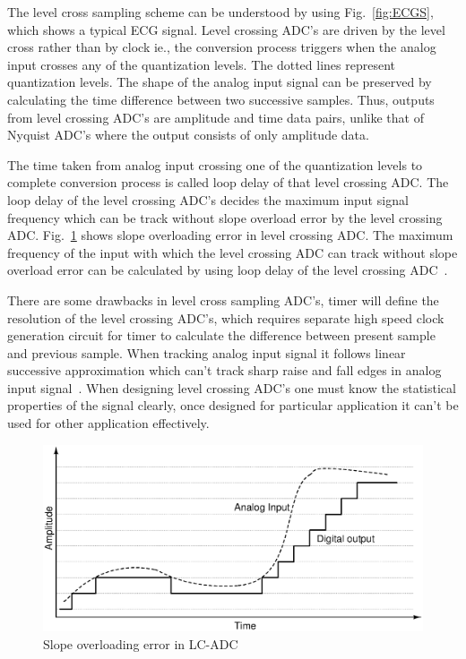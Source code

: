 \par
\hspace{0.6cm} 	The level cross sampling scheme can be understood by using Fig.~\ref{fig:ECGS}, which shows a typical ECG signal. Level crossing \mbox{ADC's} are driven by the level cross rather than by clock ie., the conversion process triggers when the analog input crosses any of the quantization levels. The dotted lines represent quantization levels. The shape of the analog input signal can be preserved by calculating the time difference between two successive samples. Thus, outputs from level crossing \mbox{ADC's} are amplitude and time data pairs, unlike that of Nyquist \mbox{ADC's} where the output consists of only amplitude data. 




\par
\hspace{0.6cm} The time taken from analog input crossing one of the quantization levels to complete conversion process is called loop delay of that level crossing ADC. The loop delay of the level crossing ADC's decides the maximum input signal frequency which can be track without slope overload error by the level crossing ADC. Fig.~\ref{fig:SOE} shows slope overloading error in level crossing ADC. The maximum frequency of the input with which the level crossing ADC can track without slope overload error can be calculated by using loop delay of the level crossing ADC~\cite{allier2005120nm}.



\par
\hspace{0.6cm} There are some drawbacks in level cross sampling ADC's, timer will define the resolution of the level crossing ADC's, which requires separate high speed clock generation circuit for timer to calculate the difference between present sample and previous sample. When tracking analog input signal it follows linear successive approximation which can't track sharp raise and fall edges in analog input signal~\cite{5672382}. When designing level crossing ADC's one must know the statistical properties of the signal clearly, once designed for particular application it can't be used for other application effectively. 

\begin{figure}[H]
	\begin{center}
		\includegraphics[scale=0.5]{./Figures/SOE.ps}
		\caption{Slope overloading error in LC-ADC}
		\label{fig:SOE}
	\end{center}
\end{figure}

